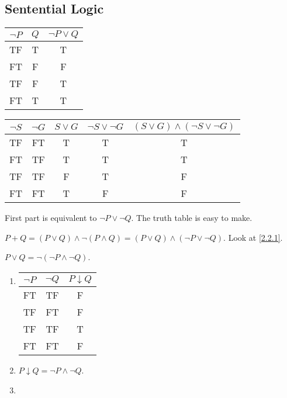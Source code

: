 \subsection{Sentential Logic}
\begin{exx} \label{2.2.1}
  \begin{tabular}{c c c}
    $\lnot P$ & $Q$ & $\lnot P \lor Q$ \\
    \hline
    TF & T & T \\
    FT & F & F\\
    TF & F & T\\
    FT & T & T
  \end{tabular}
  \begin{tabular}{c c c c c}
    $\lnot S$ & $\lnot G$ & $S\lor G$ & $\lnot S\lor \lnot G$ & $(S\lor G)\land(\lnot S\lor \lnot G)$ \\
    \hline
    TF & FT & T & T & T \\
    FT & TF & T & T & T \\
    TF & TF & F & T & F \\
    FT & FT & T & F & F
  \end{tabular}
\end{exx}

\begin{exx}
  First part is equivalent to $\lnot P\lor \lnot Q$. The truth table is easy to make.
\end{exx}

\begin{exx}
    $P+Q = (P\lor Q)\land\lnot(P\land Q) = (P\lor Q)\land(\lnot P\lor \lnot Q)$.
    Look at \autoref{2.2.1}.
\end{exx}

\begin{exx}
  $P\lor Q=\lnot(\lnot P\land \lnot Q)$.
\end{exx}

\begin{exx}
  \begin{enumerate}[label=(\alph*)]
    \item \begin{tabular}{c c c}
      $\lnot P$ & $\lnot Q$ & $P\downarrow Q$ \\
      \hline
      FT & TF & F \\
      TF & FT & F \\
      TF & TF & T \\
      FT & FT & F
    \end{tabular}
    \item $P\downarrow Q = \lnot P \land \lnot Q$.
    \item 
  \end{enumerate}
\end{exx}
